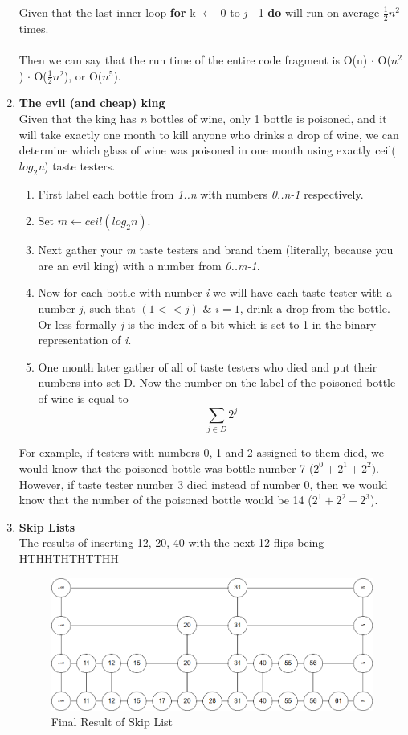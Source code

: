\documentclass{article}
\begin{document}
\begin{enumerate}
 Given that the last inner loop
   {\textbf{for} k $\leftarrow$ 0 to \textit{j} - 1 \textbf{do}
 }
 will run on average $\frac{1}{2}n^2$ times. 
 \\
 \\
 Then we can say that the run time of the entire code fragment is O(n) $\cdot$ O($n^2$) $\cdot$ O($\frac{1}{2}n^2$), or  O($n^5$). 
 
 \item \textbf{The evil (and cheap) king}
 \\
 Given that the king has \textit{n} bottles of wine, only 1 bottle is poisoned, and it will take exactly one month to kill anyone who drinks a drop of wine, we can determine which glass of wine was poisoned in one month using exactly ceil(\textit{$log_2$\textit{n}}) taste testers. 
 \begin{enumerate}
 	\item First label each bottle from \textit{1..n} with numbers \textit{0..n-1} respectively.
 	\item Set $m \leftarrow ceil(log_2\textit{n})$.
 	\item Next gather your \textit{m} taste testers and brand them (literally, because you are an evil king) with a number from \textit{0..m-1}.
 	\item Now for each bottle with number \textit{i} we will have each taste tester with   a number \textit{j}, such that $(1 << j)$ $\&$ $i = 1$, drink a drop from the bottle.
 	Or less formally \textit{j} is the index of a bit which is set to 1 in the binary representation of \textit{i}. 
	\item One month later gather of all of taste testers who died and put their numbers into set D. Now the number on the label of the poisoned bottle of wine is equal to $$\sum_{j \in D} 2^j$$
 \end{enumerate}
 	For example, if testers with numbers 0, 1 and 2 assigned to them died, we would know that the poisoned bottle was bottle number 7 ($2^0 +  2^1 + 2^2)$. However, if taste tester number 3 died instead of number 0, then we would know that the number of the poisoned bottle would be 14 ($2^1 + 2^2 + 2^3$).

 
 \item 
 \textbf{Skip Lists}
 \\
 The results of inserting 12, 20, 40 with the next 12 flips being HTHHTHTHTTHH
 \\
 \begin{figure}[H]
 	\centering
 	\caption{Final Result of Skip List}
 	\label{fig:SkipList}
	\includegraphics[width=\textwidth]{SkipList}
 \end{figure}
 

\end{enumerate}
\end{document}
